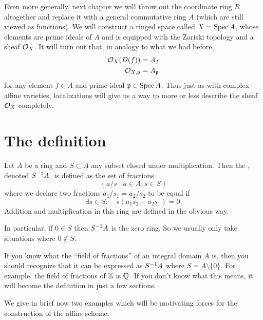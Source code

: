 Even more generally,
next chapter we will throw out the coordinate ring $R$
altogether and replace it with a general commutative ring $A$
(which are still viewed as functions).
We will construct a ringed space called $X = \operatorname{Spec} A$,
whose elements are prime ideals of $A$
and is equipped with the Zariski topology and a sheaf $\mathcal O_X$.
It will turn out that, in analogy to what we had before,
\begin{align*}
	\mathcal O_X(D(f)) &= A_f \\
	\mathcal O_{X,\mathfrak p} &= A_\mathfrak p
\end{align*}
for any element $f \in A$ and prime ideal $\mathfrak p \in \operatorname{Spec} A$.
Thus just as with complex affine varieties,
localizations will give us a way to more or less
describe the sheaf $\mathcal O_X$ completely.

\section{The definition}
\begin{definition}
	Let $A$ be a ring and $S \subset A$ any subset
	closed under multiplication.
	Then the , denoted $S^{-1} A$,
	is defined as the set of fractions
	\[ \left\{ a/s \mid a \in A, s \in S \right\} \]
	where we declare two fractions $a_1 / s_1 = a_2 / s_2$ 
	to be equal if
	\[ \exists s \in S : \quad s(a_1s_2 - a_2s_1) = 0. \]
	Addition and multiplication in this ring
	are defined in the obvious way.
\end{definition}

In particular, if $0 \in S$ then $S^{-1} A$ is the zero ring.
So we usually only take situations where $0 \notin S$.
\begin{remark}
	If you know what the ``field of fractions'' of an
	integral domain $A$ is, then you should recognize that
	it can be expressed as $S^{-1} A$ where $S = A \setminus \{0\}$.
	For example, the field of fractions of $\mathbb Z$ is $\mathbb Q$.
	If you don't know what this means,
	it will become the definition in just a few sections.
\end{remark}

We give in brief now two examples which will be
motivating forces for the construction of the affine scheme.

